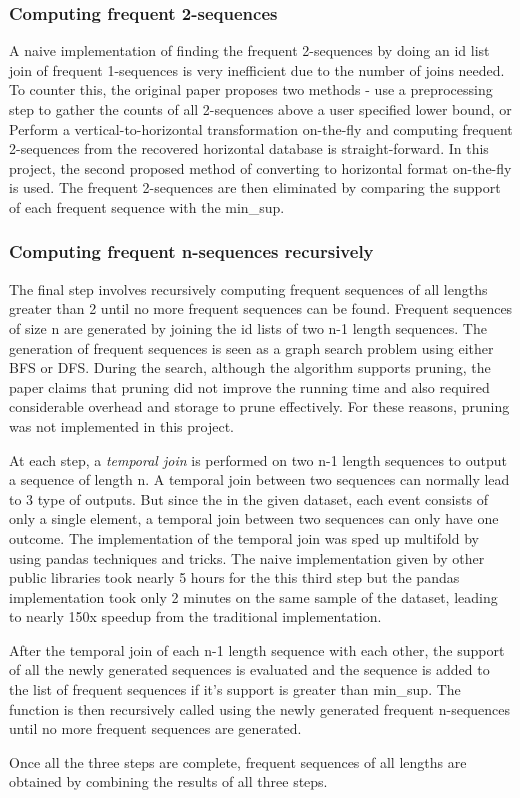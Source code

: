 \subsubsection{Computing frequent 2-sequences}

A naive implementation of finding the frequent 2-sequences by doing an id list join of frequent 1-sequences is very inefficient due to the number of joins needed. To counter this, the original paper proposes two methods - use a preprocessing step to gather the counts of all 2-sequences above a user specified lower bound, or  Perform a vertical-to-horizontal transformation on-the-fly and computing frequent 2-sequences from the recovered horizontal database is straight-forward. In this project, the second proposed method of converting to horizontal format on-the-fly is used. The frequent 2-sequences are then eliminated by comparing the support of each frequent sequence with the min\_sup.

\subsubsection{Computing frequent n-sequences recursively}

The final step involves recursively computing frequent sequences of all lengths greater than 2 until no more frequent sequences can be found. Frequent sequences of size n are generated by joining the id lists of two n-1 length sequences. The generation of frequent sequences is seen as a graph search problem using either BFS or DFS. During the search, although the algorithm supports pruning, the paper claims that pruning did not improve the running time and also required considerable overhead and storage to prune effectively. For these reasons, pruning was not implemented in this project.

At each step, a \textit{temporal join} is performed on two n-1 length sequences to output a sequence of length n. A temporal join between two sequences can normally lead to 3 type of outputs. But since the in the given dataset, each event consists of only a single element, a temporal join between two sequences can only have one outcome.
The implementation of the temporal join was sped up multifold by using pandas techniques and tricks. The naive implementation given by other public libraries took nearly 5 hours for the this third step but the pandas implementation took only 2 minutes on the same sample of the dataset, leading to nearly 150x speedup from the traditional implementation.

After the temporal join of each n-1 length sequence with each other, the support of all the newly generated sequences is evaluated and the sequence is added to the list of frequent sequences if it's support is greater than min\_sup. The function is then recursively called using the newly generated frequent n-sequences until no more frequent sequences are generated.


Once all the three steps are complete, frequent sequences of all lengths are obtained by combining the results of all three steps.